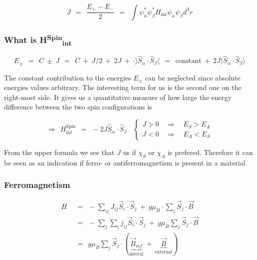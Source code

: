\documentclass[10pt]{report}
\numberwithin{equation}{chapter}
\begin{document}
\begin{equation}
  J ~~=~~ \frac{E_+-E_-}{2} ~~=~~ \int \psi^*_\alpha \psi^*_\beta H_\text{int} \psi_\alpha \psi_\beta d^3r
\end{equation}


\subsubsection{What is H\textsuperscript{Spin}\textsubscript{int}}

\begin{equation}
  E_\pm ~~=~~ C ~\pm~ J ~~=~~ C ~+~ J/2 ~+~ 2J ~+~ \cdot \rangle \hat{S}_\alpha \cdot \hat{S}_\beta \langle ~~=~~ \text{constant} ~+~ 2J \rangle \hat{S}_\alpha \cdot \hat{S}_\beta \rangle
\end{equation}

The constant contribution to the energies $E_\pm$ can be neglected since absolute energies values arbitrary. The interesting term for us is the second one on the right-most side. It gives us a quantitative measure of how large the energy difference between the two spin configurations is

\begin{equation}
  \Rightarrow ~~ H^\text{Spin}_\text{int} ~~=~~ - 2J \hat{S}_\alpha \cdot \hat{S}_\beta ~~~~ \left\{
  \begin{array}{lcr}
    J > 0 & ~~ \Rightarrow ~~ & E_S > E_A\\
    J < 0 & ~~ \Rightarrow ~~ & E_A < E_S
  \end{array}\right.
\end{equation}


From the upper formula we see that $J$ us if $\chi_S$ or $\chi_A$ is prefered. Therefore it can be seen as an indication if ferro- or antiferromagnetism is present in a material.


\subsubsection{Ferromagnetism}

\begin{align}
  H ~~& =~~ - \sum_{ij} J_{ij} \vec{S}_i \cdot \vec{S}_j ~+~ g \mu_B \cdot \sum_j \vec{S}_j \cdot \vec{B}\nonumber \\  
      & =~~ - \sum_j \sum_i j_{ij} \vec{S}_i \cdot \vec{S}_j ~+~ g \mu_B \sum_j \vec{S}_j \cdot \vec{B}\nonumber \\
      & =~~ g \mu_B \sum_j \vec{S}_j \cdot ( \underbrace{\vec{B}_{mf}}_\text{interal} ~+~ \underbrace{\vec{B}}_\text{external})
\end{align}
\end{document}
